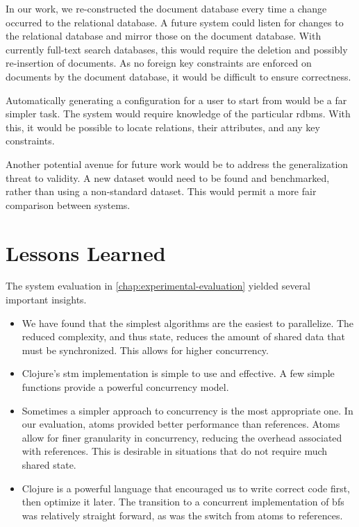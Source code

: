		In our work, we re-constructed the document database every time a change occurred to the relational database.  A future system could listen for changes to the relational database and mirror those on the document database.  With currently full-text search databases, this would require the deletion and possibly re-insertion of documents.  As no foreign key constraints are enforced on documents by the document database, it would be difficult to ensure correctness.
		
		Automatically generating a configuration for a user to start from would be a far simpler task.  The system would require knowledge of the particular \gls{rdbms}.  With this, it would be possible to locate relations, their attributes, and any key constraints.
		
		Another potential avenue for future work would be to address the generalization threat to validity.  A new dataset would need to be found and benchmarked, rather than using a non-standard dataset.  This would permit a more fair comparison between systems.
		
	\section{Lessons Learned}
		The system evaluation in \cref{chap:experimental-evaluation} yielded several important insights.
		
		\begin{itemize}
			\item We have found that the simplest algorithms are the easiest to parallelize.  The reduced complexity, and thus state, reduces the amount of shared data that must be synchronized.  This allows for higher concurrency.
			\item Clojure's \gls{stm} implementation is simple to use and effective.  A few simple functions provide a powerful concurrency model.
			\item Sometimes a simpler approach to concurrency is the most appropriate one.  In our evaluation, atoms provided better performance than references.  Atoms allow for finer granularity in concurrency, reducing the overhead associated with references.  This is desirable in situations that do not require much shared state.
			\item Clojure is a powerful language that encouraged us to write correct code first, then optimize it later.  The transition to a concurrent implementation of \gls{bfs} was relatively straight forward, as was the switch from atoms to references.
		\end{itemize}